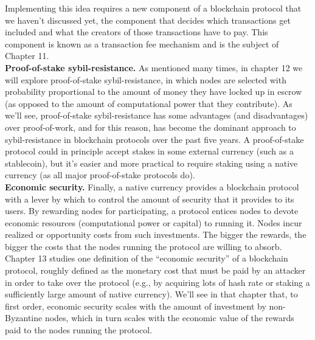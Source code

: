 Implementing this idea requires a new component of a blockchain protocol that we haven’t
discussed yet, the component that decides which transactions get included and what the
creators of those transactions have to pay. This component is known as a transaction fee
mechanism and is the subject of Chapter 11.\\

\noindent
\textbf{Proof-of-stake sybil-resistance.} As mentioned many times, in chapter 12 we will explore proof-of-stake sybil-resistance, in which nodes are selected with probability proportional to the amount of money they have locked up in escrow (as opposed to the amount of
computational power that they contribute). As we’ll see, proof-of-stake sybil-resistance has
some advantages (and disadvantages) over proof-of-work, and for this reason, has become the
dominant approach to sybil-resistance in blockchain protocols over the past five years. A
proof-of-stake protocol could in principle accept stakes in some external currency (such as a
stablecoin), but it’s easier and more practical to require staking using a native currency (as
all major proof-of-stake protocols do).\\

\noindent
\textbf{Economic security.} Finally, a native currency provides a blockchain protocol with a lever
by which to control the amount of security that it provides to its users. By rewarding nodes
for participating, a protocol entices nodes to devote economic resources (computational power
or capital) to running it. Nodes incur realized or opportunity costs from such investments. The bigger the rewards, the bigger the costs that the nodes running the protocol are willing
to absorb.\\

Chapter 13 studies one definition of the “economic security” of a blockchain protocol,
roughly defined as the monetary cost that must be paid by an attacker in order to take
over the protocol (e.g., by acquiring lots of hash rate or staking a sufficiently large amount of
native currency). We’ll see in that chapter that, to first order, economic security scales with
the amount of investment by non-Byzantine nodes, which in turn scales with the economic
value of the rewards paid to the nodes running the protocol.
